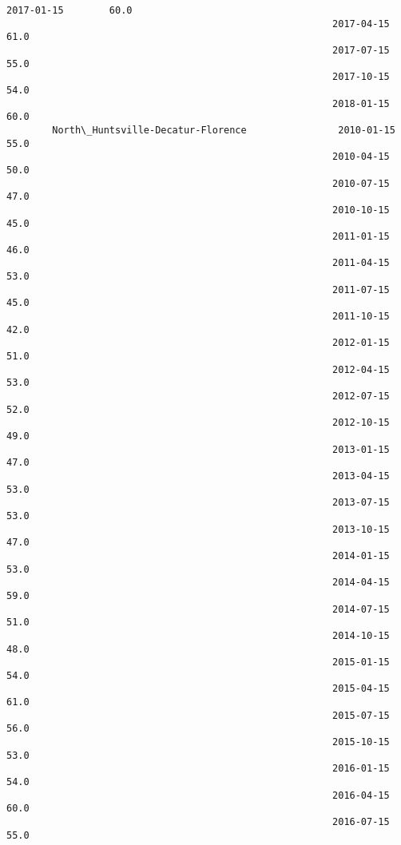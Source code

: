 \documentclass[11pt]{article}
\begin{document}
\begin{Verbatim}[commandchars=\\\{\}]
                                                         2017-01-15        60.0   
                                                         2017-04-15        61.0   
                                                         2017-07-15        55.0   
                                                         2017-10-15        54.0   
                                                         2018-01-15        60.0   
        North\_Huntsville-Decatur-Florence                2010-01-15        55.0   
                                                         2010-04-15        50.0   
                                                         2010-07-15        47.0   
                                                         2010-10-15        45.0   
                                                         2011-01-15        46.0   
                                                         2011-04-15        53.0   
                                                         2011-07-15        45.0   
                                                         2011-10-15        42.0   
                                                         2012-01-15        51.0   
                                                         2012-04-15        53.0   
                                                         2012-07-15        52.0   
                                                         2012-10-15        49.0   
                                                         2013-01-15        47.0   
                                                         2013-04-15        53.0   
                                                         2013-07-15        53.0   
                                                         2013-10-15        47.0   
                                                         2014-01-15        53.0   
                                                         2014-04-15        59.0   
                                                         2014-07-15        51.0   
                                                         2014-10-15        48.0   
                                                         2015-01-15        54.0   
                                                         2015-04-15        61.0   
                                                         2015-07-15        56.0   
                                                         2015-10-15        53.0   
                                                         2016-01-15        54.0   
                                                         2016-04-15        60.0   
                                                         2016-07-15        55.0   

\end{Verbatim}
\end{document}
